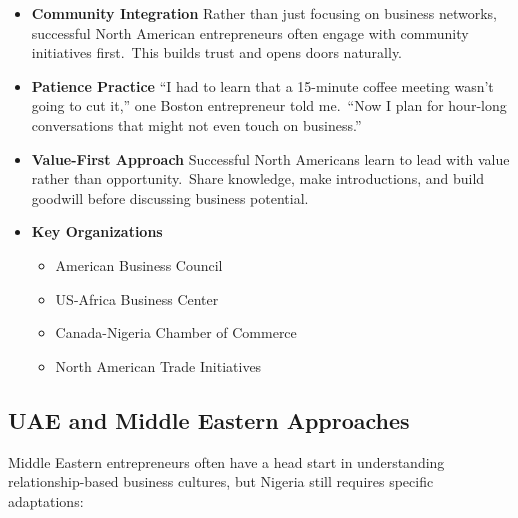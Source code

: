 \begin{itemize}
    \item \textbf{Community Integration}
    Rather than just focusing on business networks, successful North American entrepreneurs often engage with community initiatives first.\ This builds trust and opens doors naturally.

    \item \textbf{Patience Practice}
    ``I had to learn that a 15-minute coffee meeting wasn't going to cut it,'' one Boston entrepreneur told me.\ ``Now I plan for hour-long conversations that might not even touch on business.''

    \item \textbf{Value-First Approach}
    Successful North Americans learn to lead with value rather than opportunity.\ Share knowledge, make introductions, and build goodwill before discussing business potential.

    \item \textbf{Key Organizations}
    \begin{itemize}
        \item American Business Council
        \item US-Africa Business Center
        \item Canada-Nigeria Chamber of Commerce
        \item North American Trade Initiatives
    \end{itemize}
\end{itemize}

\subsection{UAE and Middle Eastern Approaches}\label{subsec:middle-eastern-networks}

Middle Eastern entrepreneurs often have a head start in understanding relationship-based business cultures, but Nigeria still requires specific adaptations:

